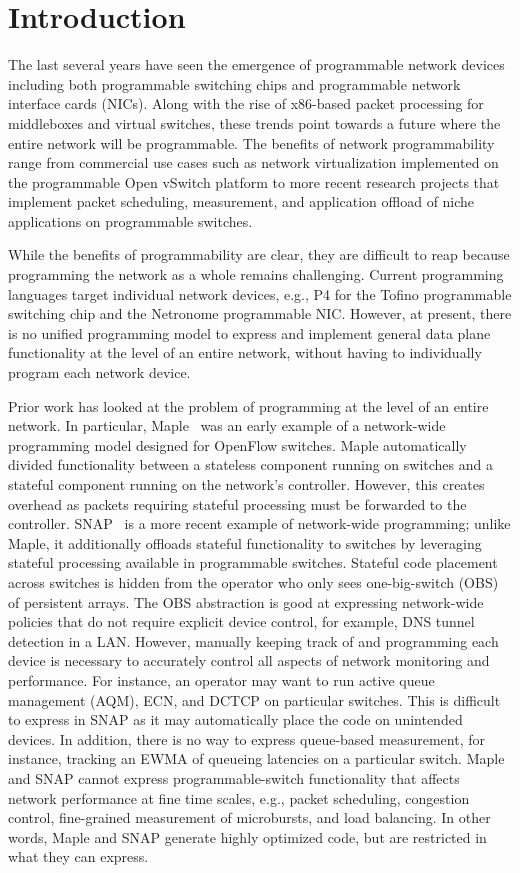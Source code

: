 \section{Introduction}
The last several years have seen the emergence of programmable network devices
including both programmable switching chips and programmable network interface
cards (NICs). Along with the rise of x86-based packet processing for
middleboxes and virtual switches, these trends point towards a future where the
entire network will be programmable. The benefits of network programmability
range from commercial use cases such as network virtualization implemented on
the programmable Open vSwitch platform to more recent research projects that
implement packet scheduling, measurement, and application offload of niche
applications on programmable switches.

While the benefits of programmability are clear, they are difficult to reap
because programming the network as a whole remains challenging. Current
programming languages target individual network devices, e.g., P4 for the
Tofino programmable switching chip and the Netronome programmable NIC. However,
at present, there is no unified programming model to express and implement
general data plane functionality at the level of an entire network, without
having to individually program each network device.

Prior work has looked at the problem of programming at the level of an entire
network. In particular, Maple~\cite{maple} was an early example of a
network-wide programming model designed for OpenFlow switches. Maple
automatically divided functionality between a stateless component running on
switches and a stateful component running on the network's controller. However,
this creates overhead as packets requiring stateful processing
must be forwarded to the controller. SNAP~\cite{snap} is a more recent example of network-wide programming; unlike
Maple, it additionally offloads stateful functionality to switches by
leveraging stateful processing available in programmable switches. Stateful code placement across switches is hidden from the operator who only sees one-big-switch (OBS) of persistent arrays. 
The OBS abstraction is good at expressing network-wide policies that do not require explicit device control, for example, DNS tunnel detection in a LAN. However, manually keeping track of and programming each device is necessary to accurately control all aspects of network monitoring and performance. For instance, an operator may want to run active queue management (AQM), ECN, and DCTCP on particular switches. This is difficult to express in SNAP as it may automatically place the code on unintended devices. In addition, there is no way to express queue-based measurement, for instance, tracking an EWMA of queueing latencies on a particular switch. Maple and SNAP cannot express programmable-switch functionality that
affects network performance at fine time scales, e.g., packet scheduling,
congestion control, fine-grained measurement of microbursts, and load
balancing. In other words, Maple and SNAP generate highly optimized code, but
are restricted in what they can express.

